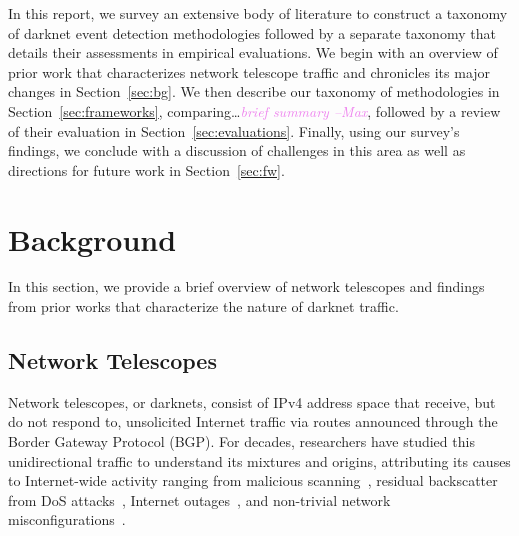 \documentclass[manuscript,nonacm]{acmart}
\newcommand{\maxnote}[1]{\textit{\textcolor{violet}{#1 --Max}}}
\begin{document}


In this report, we survey an extensive body of literature to construct a taxonomy of darknet event detection methodologies followed by a separate taxonomy that details their assessments in empirical evaluations. 
We begin with an overview of prior work that characterizes network telescope traffic and chronicles its major changes in Section~\ref{sec:bg}.
We then describe our taxonomy of methodologies in Section~\ref{sec:frameworks}, comparing\dots\maxnote{brief summary}, followed by a review of their evaluation in Section~\ref{sec:evaluations}.
Finally, using our survey's findings, we conclude with a discussion of challenges in this area as well as directions for future work in Section~\ref{sec:fw}.


\label{sec:bg}
\section{Background}

In this section, we provide a brief overview of network telescopes and findings from prior works that characterize the nature of darknet traffic.

\subsection{Network Telescopes}

Network telescopes, or darknets, consist of IPv4 address space that receive, but do not respond to, unsolicited Internet traffic via routes announced through the Border Gateway Protocol (BGP).
For decades, researchers have studied this unidirectional traffic to understand its mixtures and origins, attributing its causes to Internet-wide activity ranging from 
malicious scanning~\cite{@@}, residual backscatter from DoS attacks~\cite{@@}, Internet outages~\cite{2011dainotti,2013benson,2015benson,2012dainotti,2021padmanabhan}, and non-trivial network misconfigurations~\cite{@@}.
\end{document}
